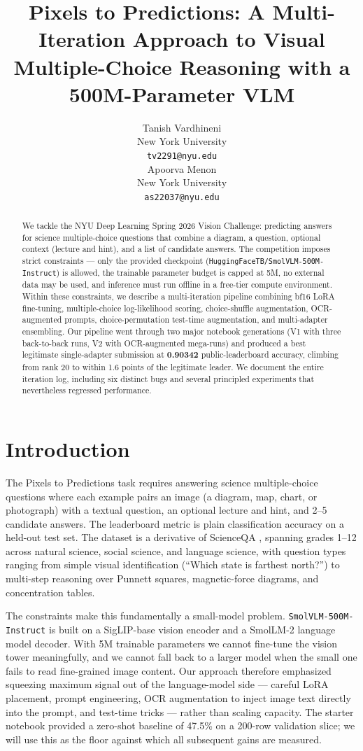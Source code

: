 \documentclass[11pt]{article}
\title{Pixels to Predictions: A Multi-Iteration Approach to Visual Multiple-Choice Reasoning with a 500M-Parameter VLM}
\author{Tanish Vardhineni \\
  New York University \\
  \texttt{tv2291@nyu.edu} \\\And
  Apoorva Menon \\
  New York University \\
  \texttt{as22037@nyu.edu} \\}
\begin{document}
\maketitle

\begin{abstract}
We tackle the NYU Deep Learning Spring 2026 Vision Challenge: predicting answers for science multiple-choice questions that combine a diagram, a question, optional context (lecture and hint), and a list of candidate answers. The competition imposes strict constraints --- only the provided checkpoint (\texttt{HuggingFaceTB/SmolVLM-500M-Instruct}) is allowed, the trainable parameter budget is capped at 5M, no external data may be used, and inference must run offline in a free-tier compute environment. Within these constraints, we describe a multi-iteration pipeline combining bf16 LoRA fine-tuning, multiple-choice log-likelihood scoring, choice-shuffle augmentation, OCR-augmented prompts, choice-permutation test-time augmentation, and multi-adapter ensembling. Our pipeline went through two major notebook generations (V1 with three back-to-back runs, V2 with OCR-augmented mega-runs) and produced a best legitimate single-adapter submission at \textbf{0.90342} public-leaderboard accuracy, climbing from rank 20 to within 1.6 points of the legitimate leader. We document the entire iteration log, including six distinct bugs and several principled experiments that nevertheless regressed performance.
\end{abstract}

\section{Introduction}

The Pixels to Predictions task requires answering science multiple-choice questions where each example pairs an image (a diagram, map, chart, or photograph) with a textual question, an optional lecture and hint, and 2--5 candidate answers. The leaderboard metric is plain classification accuracy on a held-out test set. The dataset is a derivative of ScienceQA \cite{lu2022scienceqa}, spanning grades 1--12 across natural science, social science, and language science, with question types ranging from simple visual identification (``Which state is farthest north?'') to multi-step reasoning over Punnett squares, magnetic-force diagrams, and concentration tables.

The constraints make this fundamentally a small-model problem. \texttt{SmolVLM-500M-Instruct} is built on a SigLIP-base vision encoder and a SmolLM-2 language model decoder. With 5M trainable parameters we cannot fine-tune the vision tower meaningfully, and we cannot fall back to a larger model when the small one fails to read fine-grained image content. Our approach therefore emphasized squeezing maximum signal out of the language-model side --- careful LoRA placement, prompt engineering, OCR augmentation to inject image text directly into the prompt, and test-time tricks --- rather than scaling capacity. The starter notebook provided a zero-shot baseline of 47.5\% on a 200-row validation slice; we will use this as the floor against which all subsequent gains are measured.
\end{document}
